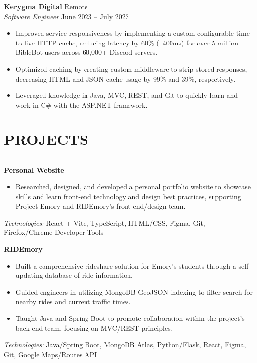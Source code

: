 \documentclass[10.5pt]{article}
\begin{document}
\noindent
\textbf{Kerygma Digital} \hfill {Remote}\\
\emph{Software Engineer} \hfill {June 2023} -- {July 2023}
\begin{itemize}
    \item Improved service responsiveness by implementing a custom configurable time-to-live HTTP cache, reducing latency by 60\% (~400ms) for over 5 million BibleBot users across 60,000+ Discord servers. \item Optimized caching by creating custom middleware to strip stored responses, decreasing HTML and JSON cache usage by 99\% and 39\%, respectively. \item Leveraged knowledge in Java, MVC, REST, and Git to quickly learn and work in C\# with the ASP.NET framework.
\end{itemize}

 \vspace{-\baselineskip}\section*{\large\textbf{PROJECTS}}
\vspace{-\baselineskip}
\noindent\rule{\textwidth}{0.4pt}


\noindent
\textbf{Personal Website}
\begin{itemize}
    \item Researched, designed, and developed a personal portfolio website to showcase skills and learn front-end technology and design best practices, supporting Project Emory and RIDEmory's front-end/design team.
\end{itemize}
\emph{Technologies:} {React + Vite, TypeScript, HTML/CSS, Figma, Git, Firefox/Chrome Developer Tools}

\noindent
\textbf{RIDEmory}
\begin{itemize}
    \item Built a comprehensive rideshare solution for Emory's students through a self-updating database of ride information. \item Guided engineers in utilizing MongoDB GeoJSON indexing to filter search for nearby rides and current traffic times. \item Taught Java and Spring Boot to promote collaboration within the project's back-end team, focusing on MVC/REST principles.
\end{itemize}
\emph{Technologies:} {Java/Spring Boot, MongoDB Atlas, Python/Flask, React, Figma, Git, Google Maps/Routes API}
\end{document}
